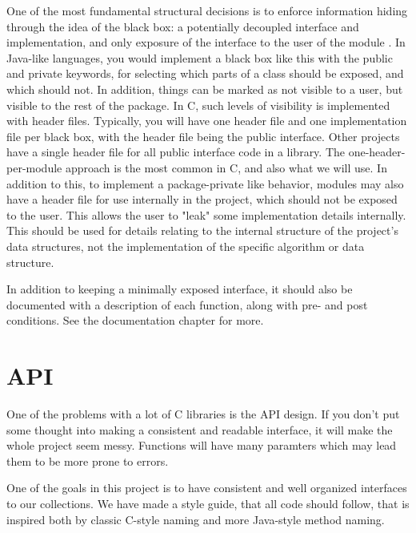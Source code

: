 \documentclass[table]{ituthesis}
\begin{document}
One of the most fundamental structural decisions is to enforce information hiding through the idea of the black box: a potentially decoupled interface and implementation, and only exposure of the interface to the user of the module \cite{Gelder2001}. In Java-like languages, you would implement a black box like this with the public and private keywords, for selecting which parts of a class should be exposed, and which should not. In addition, things can be marked as not visible to a user, but visible to the rest of the package. In C, such levels of visibility is implemented with header files. Typically, you will have one header file and one implementation file per black box, with the header file being the public interface. Other projects have a single header file for all public interface code in a library. The one-header-per-module approach is the most common in C, and also what we will use. In addition to this, to implement a package-private like behavior, modules may also have a header file for use internally in the project, which should not be exposed to the user. This allows the user to "leak" some implementation details internally. This should be used for details relating to the internal structure of the project's data structures, not the implementation of the specific algorithm or data structure.

In addition to keeping a minimally exposed interface, it should also be documented with a description of each function, along with pre- and post conditions. See the documentation chapter for more.


\section{API}\label{sec:arch_api}
	One of the problems with a lot of C libraries is the API design. If you don't put some thought into making a consistent and readable interface, it will make the whole project seem messy. Functions will have many paramters which may lead them to be more prone to errors.

	One of the goals in this project is to have consistent and well organized interfaces to our collections. We have made a style guide, that all code should follow, that is inspired both by classic C-style naming and more Java-style method naming.
\end{document}
